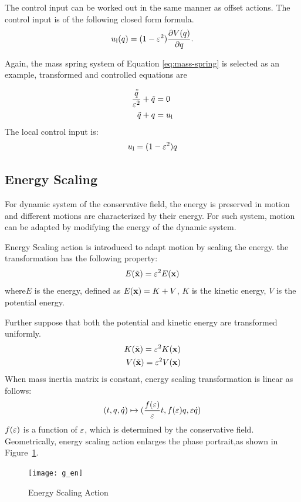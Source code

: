 The control input can be worked out in the same manner as offset actions.
The control input is of the following closed form formula.
\begin{equation}
u_{\mathrm{l}}(q) = (1-\varepsilon^2) \frac{\partial V(q)}{\partial q}.
\end{equation}

Again, the mass spring system of Equation \ref{eq:mass-spring} is selected as an example, transformed and controlled equations are

\begin{align}
\frac{\ddot{\tilde{q}}}{\varepsilon^2}+\tilde{q}&=0 \nonumber \\
\ddot{q}+q&=u_{\mathrm{l}} \nonumber
\end{align}
The local control input is:
\[
u_{\mathrm{l}}=(1-\varepsilon^2)q
\]




\subsection*{Energy Scaling}
For dynamic system of the conservative field,
the energy is preserved in motion and different motions are characterized by their energy.
For such system, motion can be adapted by modifying the energy of the dynamic system.

Energy Scaling action is introduced to adapt motion by scaling the energy.
the transformation has the following property:
\[
E(\tilde{\mathbf{x}})=\varepsilon^2 E(\mathbf{x})
\]
 where$E$ is the energy, defined as $E(\mathbf{x})=K+V$,  $K$ is the kinetic energy,
$V$ is the potential energy.

Further suppose that both the potential and kinetic energy are transformed uniformly.
\begin{align}
K(\tilde{\mathbf{x}})=\varepsilon^2 K(\mathbf{x}) \nonumber\\
V(\tilde{\mathbf{x}})=\varepsilon^2 V(\mathbf{x}) \nonumber
\end{align}
When mass inertia matrix is constant, energy scaling transformation is linear as follows:
\[
(t,q,\dot{q} ) \mapsto ( \frac{f(\varepsilon)}{\varepsilon}t ,f(\varepsilon)q,\varepsilon\dot{q})
\]
$f(\varepsilon)$ is a function of $\varepsilon$, which is determined by the conservative field.
Geometrically, energy scaling action enlarges the phase portrait,as shown in Figure~\ref{fig:gen}.
\begin{figure}[!htbp]
  \begin{center}
      \texttt{[image: g\_en]}
    \caption{Energy Scaling Action}
    \label{fig:gen}
\end{center}
\end{figure}

